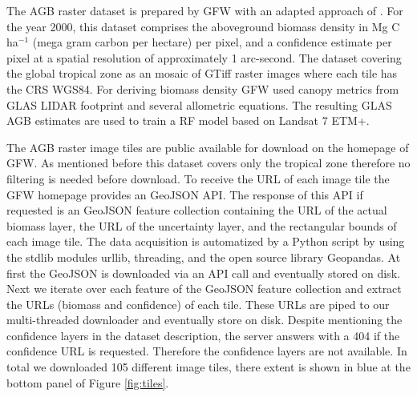 			The \ac{AGB} raster dataset is prepared by \ac{GFW} with an adapted approach of \citeauthor{Baccini2012} \citep{Baccini2012,Baccini2015,Baccini2017}. For the year 2000, this dataset comprises the aboveground biomass density in Mg C ha$^{-1}$ (mega gram carbon per hectare) per pixel, and a confidence estimate per pixel at a spatial resolution of approximately 1 arc-second. The dataset covering the global tropical zone as an mosaic of \ac{GTiff} raster images where each tile has the \ac{CRS} \ac{WGS84}. For deriving biomass density \ac{GFW} used canopy metrics from \ac{GLAS} \ac{LIDAR} footprint and several allometric equations. The resulting \ac{GLAS} \ac{AGB} estimates are used to train a \ac{RF} model based on Landsat 7 \ac{ETM+}.

			The \ac{AGB} raster image tiles are public available for download on the homepage of \ac{GFW}. As mentioned before this dataset covers only the tropical zone therefore no filtering is needed before download. To receive the \ac{URL} of each image tile the \ac{GFW} homepage provides an \ac{GeoJSON} \ac{API}. The response of this \ac{API} if requested is an \ac{GeoJSON} feature collection containing the \ac{URL} of the actual biomass layer, the \ac{URL} of the uncertainty layer, and the rectangular bounds of each image tile. The data acquisition is automatized by a Python script by using the \ac{stdlib} modules urllib, threading, and the open source library Geopandas. At first the \ac{GeoJSON} is downloaded via an \ac{API} call and eventually stored on disk. Next we iterate over each feature of the \ac{GeoJSON} feature collection and extract the \ac{URL}s (biomass and confidence) of each tile. These \ac{URL}s are piped to our multi-threaded downloader and eventually store on disk. Despite mentioning the confidence layers in the dataset description, the server answers with a 404 if the confidence \ac{URL} is requested. Therefore the confidence layers are not available. In total we downloaded 105 different image tiles, there extent is shown in blue at the bottom panel of Figure \ref{fig:tiles}.

